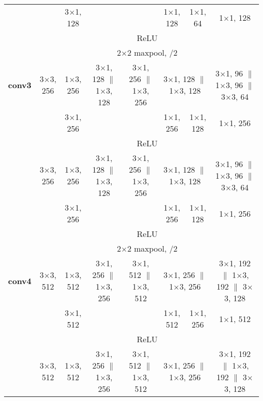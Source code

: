 \documentclass[thesis]{subfiles}
\begin{document}
{\begin{landscape}
\begin{table*}[p]
\begin{tabular}{@{}|c||c|c|c|c|c|c|c|c|@{}}
        \cline{4-4} \cline{7-9}
        & \multicolumn{2}{c|}{} & 3$\times$1, 128 & & & 1$\times$1, 128 & 1$\times$1, 64 & 1$\times$1, 128 \\
        \cline{2-9}
        & \multicolumn{8}{c|}{ReLU}\\
        \cline{2-9}
        & \multicolumn{8}{c|}{2$\times$2 maxpool, /2}\\
        \hline
        \textbf{conv3} & \multicolumn{2}{c|}{3$\times$3, 256} & 1$\times$3, 256 & 3$\times$1, 128 $\|$ 1$\times$3, 128 & 3$\times$1, 256 $\|$ 1$\times$3, 256 & \multicolumn{2}{c|}{3$\times$1, 128 $\|$ 1$\times$3, 128} & 3$\times$1, 96 $\|$ 1$\times$3, 96 $\|$ 3$\times$3, 64 \\
        \cline{4-4} \cline{7-9}
        & \multicolumn{2}{c|}{} & 3$\times$1, 256 & & & 1$\times$1, 256 & 1$\times$1, 128 & 1$\times$1, 256\\
        \cline{2-9}
        & \multicolumn{8}{c|}{ReLU}\\
        \cline{2-9}
        & \multicolumn{2}{c|}{3$\times$3, 256} & 1$\times$3, 256 & 3$\times$1, 128 $\|$ 1$\times$3, 128 & 3$\times$1, 256 $\|$ 1$\times$3, 256 &\multicolumn{2}{c|}{3$\times$1, 128 $\|$ 1$\times$3, 128} & 3$\times$1, 96 $\|$ 1$\times$3, 96 $\|$ 3$\times$3, 64 \\
        \cline{4-4} \cline{7-9}	
        & \multicolumn{2}{c|}{} & 3$\times$1, 256 & & & 1$\times$1, 256 & 1$\times$1, 128 & 1$\times$1, 256\\
        \cline{2-9}
        & \multicolumn{8}{c|}{ReLU}\\
        \cline{2-9}
        & \multicolumn{8}{c|}{2$\times$2 maxpool, /2}\\
        \hline
        \textbf{conv4} & \multicolumn{2}{c|}{3$\times$3, 512} & 1$\times$3, 512 & 3$\times$1, 256 $\|$ 1$\times$3, 256 & 3$\times$1, 512 $\|$ 1$\times$3, 512 &\multicolumn{2}{c|}{3$\times$1, 256 $\|$ 1$\times$3, 256} & 3$\times$1, 192 $\|$ 1$\times$3, 192 $\|$ 3$\times$3, 128\\
        \cline{4-4} \cline{7-9}
        & \multicolumn{2}{c|}{} & 3$\times$1, 512 & & & 1$\times$1, 512 & 1$\times$1, 256 & 1$\times$1, 512\\
        \cline{2-9}
        & \multicolumn{8}{c|}{ReLU}\\
        \cline{2-9}
        & \multicolumn{2}{c|}{3$\times$3, 512} & 1$\times$3, 512 & 3$\times$1, 256 $\|$ 1$\times$3, 256 & 3$\times$1, 512 $\|$ 1$\times$3, 512 & \multicolumn{2}{c|}{3$\times$1, 256 $\|$ 1$\times$3, 256} & 3$\times$1, 192 $\|$ 1$\times$3, 192 $\|$ 3$\times$3, 128\\

\end{tabular}
\end{table*}
\end{landscape}}
\end{document}
